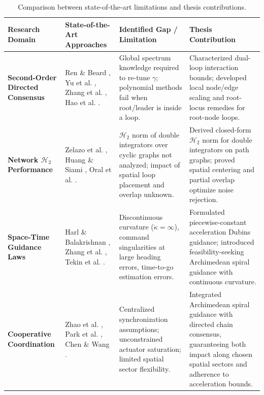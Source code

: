 \begin{table}[ht!]
\centering
\caption{Comparison between state-of-the-art limitations and thesis contributions.}
\label{tab:literature_gaps}
\renewcommand{\arraystretch}{1.3}
\begin{tabularx}{\textwidth}{|>{\raggedright\arraybackslash}p{3cm}|>{\raggedright\arraybackslash}X|>{\raggedright\arraybackslash}X|>{\raggedright\arraybackslash}X|}
\hline
\textbf{Research Domain} & \textbf{State-of-the-Art Approaches} & \textbf{Identified Gap / Limitation} & \textbf{Thesis Contribution} \\ \hline

\textbf{Second-Order Directed Consensus} & Ren \& Beard \cite{ren2008consensus}, Yu et al. \cite{yu2010some}, Zhang et al. \cite{zhang2017effect}, Hao et al. \cite{hao2019role}. & Global spectrum knowledge required to re-tune $\gamma$; polynomial methods fail when root/leader is inside a loop. & Characterized dual-loop interaction bounds; developed local node/edge scaling and root-locus remedies for root-node loops. \\ \hline

\textbf{Network $\mathcal{H}_2$ Performance} & Zelazo et al. \cite{zelazo2013performance}, Huang \& Siami \cite{huang2022role}, Oral et al. \cite{oral2017performance}. & $\mathcal{H}_2$ norm of double integrators over cyclic graphs not analyzed; impact of spatial loop placement and overlap unknown. & Derived closed-form $\mathcal{H}_2$ norm for double integrators on path graphs; proved spatial centering and partial overlap optimize noise rejection. \\ \hline

\textbf{Space-Time Guidance Laws} & Harl \& Balakrishnan \cite{harl2011impact}, Zhang et al. \cite{Zhang2013}, Tekin et al. \cite{Tekin2016_IT}. & Discontinuous curvature ($\dot{\kappa} = \infty$), command singularities at large heading errors, time-to-go estimation errors. & Formulated piecewise-constant acceleration Dubins guidance; introduced feasibility-seeking Archimedean spiral guidance with continuous curvature. \\ \hline

\textbf{Cooperative Coordination} & Zhao et al. \cite{zhao2015terminal}, Park et al. \cite{park2013optimal}, Chen \& Wang \cite{Chen2018AST}. & Centralized synchronization assumptions; unconstrained actuator saturation; limited spatial sector flexibility. & Integrated Archimedean spiral guidance with directed chain consensus, guaranteeing both impact along chosen spatial sectors and adherence to acceleration bounds. \\ \hline
\end{tabularx}
\end{table}
